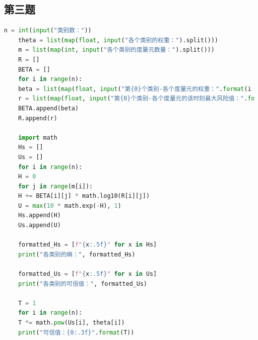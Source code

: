 \documentclass{article}
\begin{document}
\subsection{第三题}

\begin{lstlisting}[language=Python]
	n = int(input("类别数："))
	theta = list(map(float, input("各个类别的权重：").split()))
	m = list(map(int, input("各个类别的度量元数量：").split()))
	R = []
	BETA = []
	for i in range(n):
	beta = list(map(float, input("第{0}个类别-各个度量元的权重：".format(i + 1)).split()))
	r = list(map(float, input("第{0}个类别-各个度量元的该时刻最大风险值：".format(i + 1)).split()))
	BETA.append(beta)
	R.append(r)
	
	import math
	Hs = []
	Us = []
	for i in range(n):
	H = 0
	for j in range(m[i]):
	H += BETA[i][j] * math.log10(R[i][j])
	U = max(10 * math.exp(-H), 1)
	Hs.append(H)
	Us.append(U)
	
	formatted_Hs = [f"{x:.5f}" for x in Hs]
	print("各类别的熵：", formatted_Hs)
	
	formatted_Us = [f"{x:.5f}" for x in Us]
	print("各类别的可信值：", formatted_Us)
	
	T = 1
	for i in range(n):
	T *= math.pow(Us[i], theta[i])
	print("可信值：{0:.3f}".format(T))
	
	
\end{lstlisting}
\end{document}
